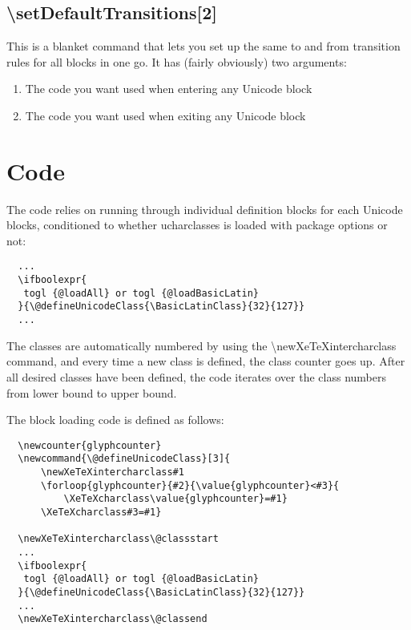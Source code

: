 ﻿\documentclass{article}
\newenvironment{numberlist}{%
  \begin{enumerate}
	\setlength{\itemsep}{0pt}
	\setlength{\parsep}{0pt}
	\setlength{\topsep}{0pt}
	\setlength{\partopsep}{0pt}
	\setlength{\parskip}{0pt}
	\setlength{\labelsep}{5pt}}%
{
  \end{enumerate}}
\begin{document}
		\subsection{\textbackslash setDefaultTransitions[2]}
		
			This is a blanket command that lets you set up the same to and from transition rules for all blocks in one go. It has (fairly obviously) two arguments:
			
			\begin{numberlist}
				\item The code you want used when entering any Unicode block
				\item The code you want used when exiting any Unicode block
			\end{numberlist}

	\section{Code}
	
		The code relies on running through individual definition blocks for each Unicode blocks, conditioned to whether ucharclasses is loaded with package options or not:
		
		\pagebreak
		
		\disableTransitionRules
		\begin{verbatim}
  ...
  \ifboolexpr{
   togl {@loadAll} or togl {@loadBasicLatin}
  }{\@defineUnicodeClass{\BasicLatinClass}{32}{127}}
  ...
		\end{verbatim}
		\enableTransitionRules
		
		The classes are automatically numbered by using the \textbackslash newXeTeXintercharclass command, and every time a new class is defined, the class counter goes up. After all desired classes have been defined, the code iterates over the class numbers from lower bound to upper bound.
		
		The block loading code is defined as follows:
		
		\disableTransitionRules
		\begin{verbatim}
  \newcounter{glyphcounter}
  \newcommand{\@defineUnicodeClass}[3]{
      \newXeTeXintercharclass#1
      \forloop{glyphcounter}{#2}{\value{glyphcounter}<#3}{
          \XeTeXcharclass\value{glyphcounter}=#1}
      \XeTeXcharclass#3=#1}

  \newXeTeXintercharclass\@classstart
  ...
  \ifboolexpr{
   togl {@loadAll} or togl {@loadBasicLatin}
  }{\@defineUnicodeClass{\BasicLatinClass}{32}{127}}
  ...
  \newXeTeXintercharclass\@classend
		\end{verbatim}
		\enableTransitionRules
\end{document}
